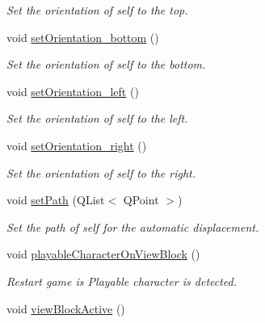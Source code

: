 \begin{DoxyCompactItemize}
\begin{DoxyCompactList}\small\item\em Set the orientation of self to the top. \end{DoxyCompactList}\item 
\hypertarget{class_g___n_p_c_a0bbff0e4fede0f6197312a366910a6b1}{}void \hyperlink{class_g___n_p_c_a0bbff0e4fede0f6197312a366910a6b1}{set\+Orientation\+\_\+bottom} ()\label{class_g___n_p_c_a0bbff0e4fede0f6197312a366910a6b1}

\begin{DoxyCompactList}\small\item\em Set the orientation of self to the bottom. \end{DoxyCompactList}\item 
\hypertarget{class_g___n_p_c_a95a1c3b344d34d2918505b4591d93b14}{}void \hyperlink{class_g___n_p_c_a95a1c3b344d34d2918505b4591d93b14}{set\+Orientation\+\_\+left} ()\label{class_g___n_p_c_a95a1c3b344d34d2918505b4591d93b14}

\begin{DoxyCompactList}\small\item\em Set the orientation of self to the left. \end{DoxyCompactList}\item 
\hypertarget{class_g___n_p_c_ac8985a2b56b6082c1025ec061eac7bb0}{}void \hyperlink{class_g___n_p_c_ac8985a2b56b6082c1025ec061eac7bb0}{set\+Orientation\+\_\+right} ()\label{class_g___n_p_c_ac8985a2b56b6082c1025ec061eac7bb0}

\begin{DoxyCompactList}\small\item\em Set the orientation of self to the right. \end{DoxyCompactList}\item 
\hypertarget{class_g___n_p_c_a394604b45fd2f51b46055b370c9c1d2f}{}void \hyperlink{class_g___n_p_c_a394604b45fd2f51b46055b370c9c1d2f}{set\+Path} (Q\+List$<$ Q\+Point $>$)\label{class_g___n_p_c_a394604b45fd2f51b46055b370c9c1d2f}

\begin{DoxyCompactList}\small\item\em Set the path of self for the automatic displacement. \end{DoxyCompactList}\item 
void \hyperlink{class_g___n_p_c_a49883585ada9c0308c0d620c98556f34}{playable\+Character\+On\+View\+Block} ()
\begin{DoxyCompactList}\small\item\em Restart game is Playable character is detected. \end{DoxyCompactList}\item 
\hypertarget{class_g___n_p_c_a39d36f9f6e71dbef7c937d8ab8a48638}{}void \hyperlink{class_g___n_p_c_a39d36f9f6e71dbef7c937d8ab8a48638}{view\+Block\+Active} ()\label{class_g___n_p_c_a39d36f9f6e71dbef7c937d8ab8a48638}


\end{DoxyCompactItemize}
